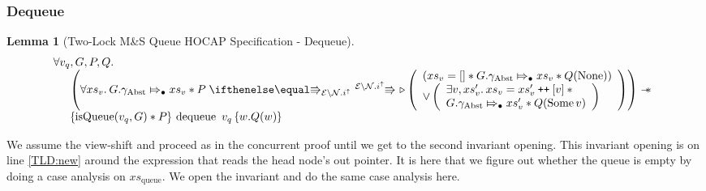 \documentclass[a4paper, 10pt]{report}
\theoremstyle{definition}
\newtheorem{lemma}[theorem]{Lemma}
\newcommand{\dequeue}{\operatorname{dequeue}}
\newcommand{\msq}{M\&S Queue}
\newcommand{\tlmsq}{Two-Lock \msq{}}
\newcommand{\isqueue}{\operatorname{isQueue}}
\newcommand{\vq}{v_q}
\newcommand{\xsqueue}{xs_{\mathrm{queue}}}
\newcommand{\nodeval}{\valB}
\newcommand{\absvalue}{\val}
\newcommand{\absvalueList}{xs_v}
\newcommand{\Qg}{G}
\newcommand{\gabst}{\gname_{\mathrm{Abst}}}
\newcommand\catenate{\mathbin{\text{\ttfamily\upshape ++}}}
\newcommand{\Nl}{\ensuremath{\mathcal{N}}}
\newcommand{\abstractstateauth}[2]{#1 \Mapsto_{\bullet} #2}
\newcommand{\hocapspecdeqVSGen}[6]{
  \abstractstateauth{#1.\gabst}{#4} \star{} #2 \vs[\mask\setminus\Nl.i^\uparrow] \later
  \left(
    \begin{array}{l}
      (#4 = [] \star{} \abstractstateauth{#1.\gabst}{#4} \star{} #3(\None))\\
      \lor{}
      \left(
        \begin{array}{l}
          \Exists #5, #6 . #4 = #6 \catenate [#5] \star{}\\
          \abstractstateauth{#1.\gabst}{#6} \star{} #3(\Some{#5})
        \end{array}
        \right)
    \end{array}
  \right)
}
\newcommand{\hocapspecdeqVS}[4]{\hocapspecdeqVSGen{#1}{#2}{#3}{#4}{\absvalue}{#4'}}
\newcommand{\hocapspecdeqHT}[4]{\hoare{\isqueue(#1, #2) \star{} #3}{\dequeue \ #1}{\nodeval . #4(\nodeval)}}
\newcommand{\hocapspecdeqGen}[5]{\begin{array}[t]{l}
  \All #1, #2, #3, #4.\\
  \begin{array}[t]{l}
  \quad\left(\All #5 . \hocapspecdeqVS{#2}{#3}{#4}{#5} \right) \wand\\
  \quad\hocapspecdeqHT{#1}{#2}{#3}{#4}
  \end{array}
\end{array}}
\newcommand{\hocapspecdeq}{\hocapspecdeqGen{\vq}{\Qg}{P}{Q}{\absvalueList}}
\begin{document}
\subsubsection{Dequeue}
\begin{lemma}[\tlmsq{} HOCAP Specification - Dequeue]\label{TLMSQ:spec:hocap:dequeue}
  \begin{equation*}
    \hocapspecdeq
  \end{equation*}
\end{lemma}
We assume the view-shift and proceed as in the concurrent proof until we get to the second invariant opening. This invariant opening is on line \ref{TLD:new} around the expression that reads the head node's out pointer. It is here that we figure out whether the queue is empty by doing a case analysis on $\xsqueue$. We open the invariant and do the same case analysis here.
\end{document}
